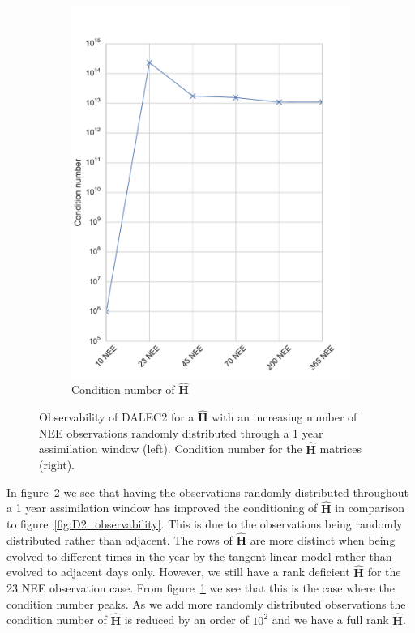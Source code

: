 \documentclass[11pt]{article}
\begin{document}
\begin{figure}[ht]
\begin{subfigure}[b]{0.4\textwidth}
        \includegraphics[width=\textwidth]{dalec2_obsrankcondwind.pdf}
        \caption{Condition number of $\hat{\textbf{H}}$}
        \label{fig:D2_observabilitycondwind}
    \end{subfigure}
    \caption{Observability of DALEC2 for a $\hat{\textbf{H}}$ with an increasing number of NEE observations randomly distributed through a 1 year assimilation window (left). Condition number for the $\hat{\textbf{H}}$ matrices (right).}
    \label{fig:D2_observabilitywind}
\end{figure}

In figure~\ref{fig:D2_observabilitywind} we see that having the observations randomly distributed throughout a 1 year assimilation window has improved the conditioning of $\hat{\textbf{H}}$ in comparison to figure~\ref{fig:D2_observability}. This is due to the observations being randomly distributed rather than adjacent. The rows of $\hat{\textbf{H}}$ are more distinct when being evolved to different times in the year by the tangent linear model rather than evolved to adjacent days only. However, we still have a rank deficient $\hat{\textbf{H}}$ for the 23 NEE observation case. From figure~\ref{fig:D2_observabilitycondwind} we see that this is the case where the condition number peaks. As we add more randomly distributed observations the condition number of $\hat{\textbf{H}}$ is reduced by an order of $10^{2}$ and we have a full rank $\hat{\textbf{H}}$. 
\end{document}
